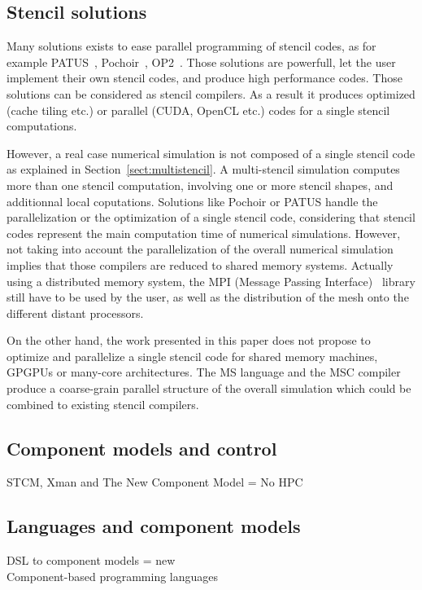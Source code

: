 \subsection{Stencil solutions}

Many solutions exists to ease parallel programming of stencil codes, as for example PATUS~\cite{citeulike12258902}, Pochoir~\cite{spaaTangCKLL11}, OP2~\cite{Giles2011}. Those solutions are powerfull, let the user implement their own stencil codes, and produce high performance codes. Those solutions can be considered as stencil compilers. As a result it produces optimized (cache tiling etc.) or parallel (CUDA, OpenCL etc.) codes for a single stencil computations. 

However, a real case numerical simulation is not composed of a single stencil code as explained in Section~\ref{sect:multistencil}. A multi-stencil simulation computes more than one stencil computation, involving one or more stencil shapes, and additionnal local coputations. Solutions like Pochoir or PATUS handle the parallelization or the optimization of a single stencil code, considering that stencil codes represent the main computation time of numerical simulations. However, not taking into account the parallelization of the overall numerical simulation implies that those compilers are reduced to shared memory systems. Actually using a distributed memory system, the MPI (Message Passing Interface)~\cite{Graham2009MSE} library still have to be used by the user, as well as the distribution of the mesh onto the different distant processors.

On the other hand, the work presented in this paper does not propose to optimize and parallelize a single stencil code for shared memory machines, GPGPUs or many-core architectures. The MS language and the MSC compiler produce a coarse-grain parallel structure of the overall simulation which could be combined to existing stencil compilers.

\subsection{Component models and control}

STCM, Xman and The New Component Model = No HPC

\subsection{Languages and component models}

DSL to component models = new\\
Component-based programming languages